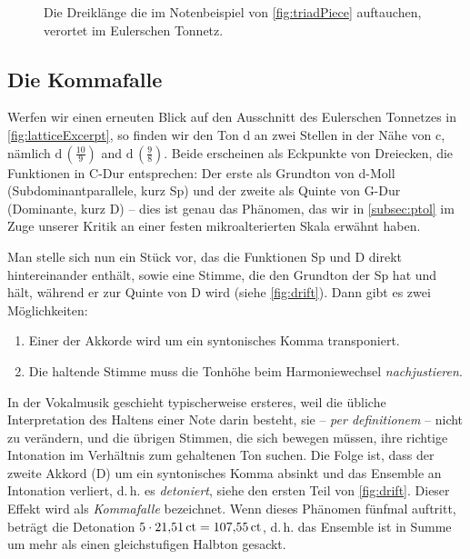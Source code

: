 \begin{figure}
  
  \caption{Die Dreiklänge die im Notenbeispiel von \cref{fig:triadPiece}
    auftauchen, verortet im Eulerschen Tonnetz.}\label{fig:chordsLattice}
\end{figure}

\subsection{Die Kommafalle}

Werfen wir einen erneuten Blick auf den Ausschnitt des Eulerschen Tonnetzes in
\cref{fig:latticeExcerpt}, so finden wir den Ton d an zwei Stellen in der Nähe
von c, nämlich \naturalm $\text{d}\,(\frac{10}9)$ and
$\text{d}\,(\frac98)$. Beide erscheinen als Eckpunkte von Dreiecken, die
Funktionen in C-Dur entsprechen: Der erste als Grundton von d-Moll
(Subdominantparallele, kurz Sp) und der zweite als Quinte von G-Dur (Dominante,
kurz D) – dies ist genau das Phänomen, das wir in \cref{subsec:ptol} im Zuge
unserer Kritik an einer festen mikroalterierten Skala erwähnt haben.

Man stelle sich nun ein Stück vor, das die Funktionen Sp und D direkt
hintereinander enthält, sowie eine Stimme, die den Grundton der Sp hat und hält,
während er zur Quinte von D wird (siehe \cref{fig:drift}). Dann gibt es
zwei Möglichkeiten:

\begin{enumerate}[itemsep=0em]
\item Einer der Akkorde wird um ein syntonisches Komma transponiert.
\item Die haltende Stimme muss die Tonhöhe beim Harmoniewechsel 
  \emph{nachjustieren}.
\end{enumerate}%
%
In der Vokalmusik geschieht typischerweise ersteres, weil die übliche
Interpretation des Haltens einer Note darin besteht, sie – \emph{per
  definitionem} – nicht zu verändern, und die übrigen Stimmen, die sich bewegen
müssen, ihre richtige Intonation im Verhältnis zum gehaltenen Ton suchen. Die
Folge ist, dass der zweite Akkord (D) um ein syntonisches Komma absinkt
und das Ensemble an Intonation verliert, d.\,h. es \emph{detoniert}, siehe den
ersten Teil von \cref{fig:drift}. Dieser Effekt wird als \emph{Kommafalle}
bezeichnet. Wenn dieses Phänomen fünfmal auftritt, beträgt die Detonation
$5\cdot 21{,}51\,\text{ct}=107{,}55\,\text{ct}$, d.\,h. das Ensemble ist in Summe um
mehr als einen gleichstufigen Halbton gesackt.

